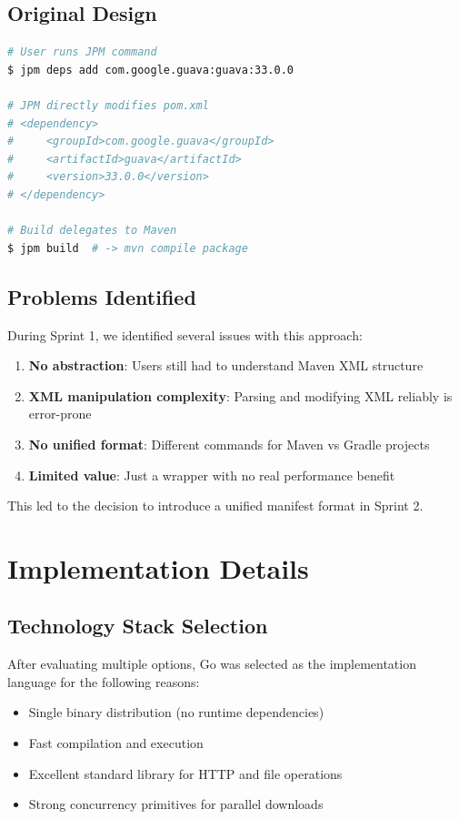 \documentclass[12pt,a4paper]{report}
\begin{document}
\subsection{Original Design}

\begin{lstlisting}[language=bash, caption=Sprint 1 - Direct POM Approach]
# User runs JPM command
$ jpm deps add com.google.guava:guava:33.0.0

# JPM directly modifies pom.xml
# <dependency>
#     <groupId>com.google.guava</groupId>
#     <artifactId>guava</artifactId>
#     <version>33.0.0</version>
# </dependency>

# Build delegates to Maven
$ jpm build  # -> mvn compile package
\end{lstlisting}

\subsection{Problems Identified}

During Sprint 1, we identified several issues with this approach:

\begin{enumerate}
    \item \textbf{No abstraction}: Users still had to understand Maven XML structure
    \item \textbf{XML manipulation complexity}: Parsing and modifying XML reliably is error-prone
    \item \textbf{No unified format}: Different commands for Maven vs Gradle projects
    \item \textbf{Limited value}: Just a wrapper with no real performance benefit
\end{enumerate}

This led to the decision to introduce a unified manifest format in Sprint 2.

\section{Implementation Details}

\subsection{Technology Stack Selection}

After evaluating multiple options, Go was selected as the implementation language for the following reasons:

\begin{itemize}
    \item Single binary distribution (no runtime dependencies)
    \item Fast compilation and execution
    \item Excellent standard library for HTTP and file operations
    \item Strong concurrency primitives for parallel downloads
\end{itemize}
\end{document}
